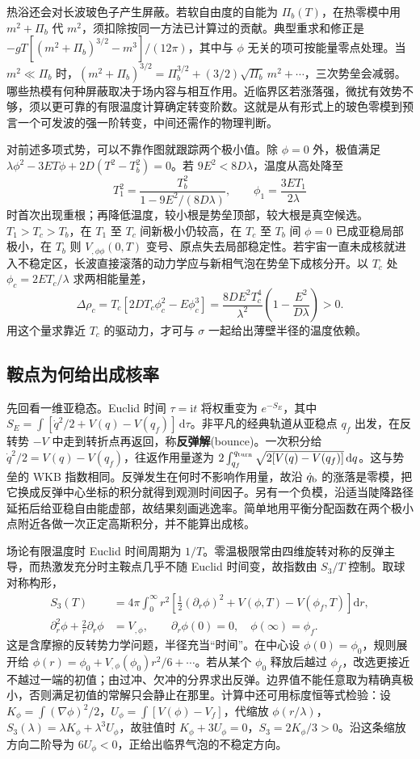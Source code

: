 热浴还会对长波玻色子产生屏蔽。若软自由度的自能为 $\Pi_b(T)$，在热零模中用 $m^2+\Pi_b$ 代 $m^2$，须扣除按同一方法已计算过的贡献。典型重求和修正是 $-gT[(m^2+\Pi_b)^{3/2}-m^3]/(12\pi)$，其中与 $\phi$ 无关的项可按能量零点处理。当 $m^2\ll\Pi_b$ 时，$(m^2+\Pi_b)^{3/2}=\Pi_b^{3/2}+(3/2)\sqrt{\Pi_b}\,m^2+\cdots$，三次势垒会减弱。哪些热模有何种屏蔽取决于场内容与相互作用。近临界区若涨落强，微扰有效势不够，须以更可靠的有限温度计算确定转变阶数。这就是从有形式上的玻色零模到预言一个可发波的强一阶转变，中间还需作的物理判断。

对前述多项式势，可以不靠作图就跟踪两个极小值。除 $\phi=0$ 外，极值满足 $\lambda\phi^2-3ET\phi+2D(T^2-T_b^2)=0$。若 $9E^2<8D\lambda$，温度从高处降至
\[
 T_1^2=\frac{T_b^2}{1-9E^2/(8D\lambda)},\qquad
 \phi_1=\frac{3ET_1}{2\lambda}
\]
时首次出现重根；再降低温度，较小根是势垒顶部，较大根是真空候选。$T_1>T_c>T_b$，在 $T_1$ 至 $T_c$ 间新极小仍较高，在 $T_c$ 至 $T_b$ 间 $\phi=0$ 已成亚稳局部极小，在 $T_b$ 则 $V_{,\phi\phi}(0,T)$ 变号、原点失去局部稳定性。若宇宙一直未成核就进入不稳定区，长波直接滚落的动力学应与新相气泡在势垒下成核分开。以 $T_c$ 处 $\phi_c=2ET_c/\lambda$ 求两相能量差，
\[
 \Delta\rho_c=T_c[2DT_c\phi_c^2-E\phi_c^3]
 =\frac{8DE^2T_c^4}{\lambda^2}
 \left(1-\frac{E^2}{D\lambda}\right)>0.
\]
用这个量求靠近 $T_c$ 的驱动力，才可与 $\sigma$ 一起给出薄壁半径的温度依赖。
\subsection{鞍点为何给出成核率}

先回看一维亚稳态。Euclid 时间 $\tau=\mathrm i t$ 将权重变为 $e^{-S_E}$，其中 $S_E=\int[\dot q^2/2+V(q)-V(q_f)]\,\mathrm d\tau$。非平凡的经典轨道从亚稳点 $q_f$ 出发，在反转势 $-V$ 中走到转折点再返回，称\textbf{反弹解}(bounce)。一次积分给 $\dot q^2/2=V(q)-V(q_f)$，往返作用量遂为 $2\int_{q_f}^{q_{\rm turn}}\sqrt{2[V(q)-V(q_f)]}\,\mathrm dq$。这与势垒的 WKB 指数相同。反弹发生在何时不影响作用量，故沿 $\dot q_{\rm b}$ 的涨落是零模，把它换成反弹中心坐标的积分就得到观测时间因子。另有一个负模，沿适当陡降路径延拓后给亚稳自由能虚部，故结果刻画逃逸率。简单地用平衡分配函数在两个极小点附近各做一次正定高斯积分，并不能算出成核。

场论有限温度时 Euclid 时间周期为 $1/T$。零温极限常由四维旋转对称的反弹主导，而热激发充分时主鞍点几乎不随 Euclid 时间变，故指数由 $S_3/T$ 控制。取球对称构形，
\begin{align}
 S_3(T)&=4\pi\int_0^\infty r^2
 \left[\tfrac12(\partial_r\phi)^2+V(\phi,T)-V(\phi_f,T)\right]\mathrm dr,\nonumber\\
 \partial_r^2\phi+\frac2r\partial_r\phi&=V_{,\phi},\qquad
 \partial_r\phi(0)=0,\quad\phi(\infty)=\phi_f .\label{eq:gw-d-bounce}
\end{align}
这是含摩擦的反转势力学问题，半径充当“时间”。在中心设 $\phi(0)=\phi_0$，规则展开给 $\phi(r)=\phi_0+V_{,\phi}(\phi_0)r^2/6+\cdots$。若从某个 $\phi_0$ 释放后越过 $\phi_f$，改选更接近不越过一端的初值；由过冲、欠冲的分界求出反弹。边界值不能任意取为精确真极小，否则满足初值的常解只会静止在那里。计算中还可用标度恒等式检验：设 $K_\phi=\int(\nabla\phi)^2/2$，$U_\phi=\int[V(\phi)-V_f]$，代缩放 $\phi(r/\lambda)$，$S_3(\lambda)=\lambda K_\phi+\lambda^3U_\phi$，故驻值时 $K_\phi+3U_\phi=0$，$S_3=2K_\phi/3>0$。沿这条缩放方向二阶导为 $6U_\phi<0$，正给出临界气泡的不稳定方向。

